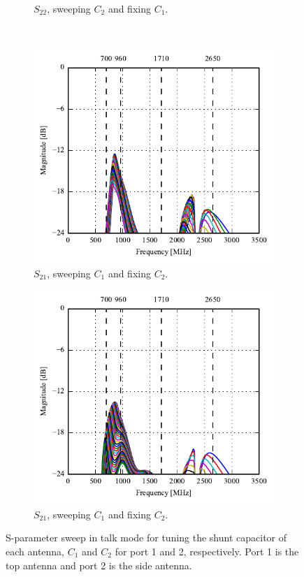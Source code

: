 \begin{figure}[htbp]
\begin{subfigure}[b]{0.49\linewidth}
        \caption{$S_{22}$, sweeping $C_2$ and fixing $C_1$.}
    \end{subfigure}
~
    \begin{subfigure}[b]{0.49\linewidth}
        \centering
        \includegraphics{img/tech_sol/monopole/highband/ue/talkmode/s12.pdf}
        \caption{$S_{21}$, sweeping $C_1$ and fixing $C_2$.}
    \end{subfigure}
    \hfill
    \begin{subfigure}[b]{0.49\linewidth}
        \centering
        \includegraphics{img/tech_sol/monopole/highband/ue/talkmode/s21.pdf}
        \caption{$S_{21}$, sweeping $C_1$ and fixing $C_2$.}
    \end{subfigure}
    \caption{S-parameter sweep in talk mode for tuning the shunt capacitor of each antenna, $C_1$ and $C_2$ for port 1 and 2, respectively. Port 1 is the top antenna and port 2 is the side antenna.}
    \label{fig:sparam_mono_modi_talk_mode}
\end{figure}


